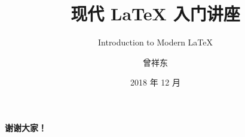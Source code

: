 \documentclass[fontset=none]{ctexbeamer}
\title{现代 \LaTeX{} 入门讲座}
\subtitle{Introduction to Modern \LaTeX{}}
\author{曾祥东}
\institute{复旦大学\quad 物理系}
\date{2018 年 12 月}
\begin{document}
\maketitle









\begin{frame}[standout]
  \huge \textbf{谢谢大家！}
\end{frame}
\end{document}
